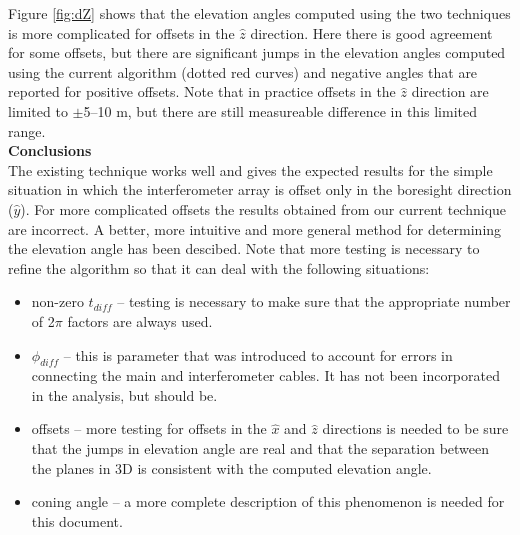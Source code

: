 \documentclass{article}
\begin{document}
\noindent
Figure \ref{fig:dZ} shows that the elevation angles computed using the
two techniques is more complicated for offsets in the $\hat{z}$ direction.
Here there is good agreement for some offsets, but there are significant
jumps in the elevation angles computed using the current algorithm (dotted
red curves) and negative angles that are reported for positive offsets.
Note that in practice offsets in the $\hat{z}$ direction are limited to
$\pm$5--10 m, but there are still measureable difference in this limited
range. \\


\noindent
{\large \bf Conclusions} \\

\noindent
The existing technique works well and gives the expected results for the
simple situation in which the interferometer array is offset only in the
boresight direction ($\hat{y}$). For more complicated offsets the results
obtained from our current technique are incorrect. A better, more intuitive
and more general method for determining the elevation angle has been descibed.
Note that more testing is necessary to refine the algorithm so that it can
deal with the following situations:

\begin{itemize}
\item non-zero $t_{diff}$ -- testing is necessary to make sure that the
appropriate number of 2$\pi$ factors are always used.
\item $\phi_{diff}$ -- this is parameter that was introduced to account for
errors in connecting the main and interferometer cables. It has not been
incorporated in the analysis, but should be.
\item offsets -- more testing for offsets in the $\hat{x}$ and $\hat{z}$
directions is needed to be sure that the jumps in elevation angle are real
and that the separation between the planes in 3D is consistent with the
computed elevation angle.
\item coning angle -- a more complete description of this phenomenon is
needed for this document.
\end{itemize}
\end{document}
